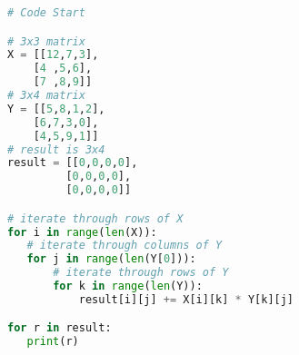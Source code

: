 \documentclass[paper=a4, fontsize=11pt]{scrartcl} %
\numberwithin{equation}{section} %
\numberwithin{figure}{section} %
\numberwithin{table}{section} %
\begin{document}
\vspace{1cm}


\begin{framed}
\begin{lstlisting}[language=Python]
# Code Start

# 3x3 matrix
X = [[12,7,3],
    [4 ,5,6],
    [7 ,8,9]]
# 3x4 matrix
Y = [[5,8,1,2],
    [6,7,3,0],
    [4,5,9,1]]
# result is 3x4
result = [[0,0,0,0],
         [0,0,0,0],
         [0,0,0,0]]

# iterate through rows of X
for i in range(len(X)):
   # iterate through columns of Y
   for j in range(len(Y[0])):
       # iterate through rows of Y
       for k in range(len(Y)):
           result[i][j] += X[i][k] * Y[k][j]

for r in result:
   print(r)

\end{lstlisting}
\end{framed}
\end{document}
